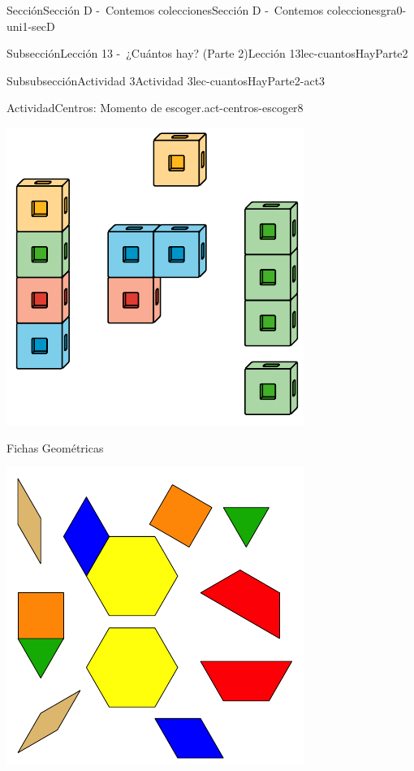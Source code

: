 \documentclass[twoside,10pt,]{article}
\begin{document}
\begin{sectionptx}{Sección}{Sección D -~Contemos colecciones}{}{Sección D -~Contemos colecciones}{}{}{gra0-uni1-secD}
\begin{subsectionptx}{Subsección}{Lección 13 -~¿Cuántos hay? (Parte 2)}{}{Lección 13}{}{}{lec-cuantosHayParte2}
\begin{subsubsectionptx}{Subsubsección}{Actividad 3}{}{Actividad 3}{}{}{lec-cuantosHayParte2-act3}
\begin{activity}{Actividad}{Centros: Momento de escoger.}{act-centros-escoger8}
\begin{sidebyside}{2}{0.025}{0.025}{0.05}
\begin{sbspanel}{0.45}
\includegraphics[width=\linewidth]{external/svg-source/tikz-file-128850.pdf}
\end{sbspanel}%
\begin{sbspanel}{0.45}%
Fichas Geométricas%
\par
\includegraphics[width=\linewidth]{external/svg-source/tikz-file-147344.pdf}

\end{sbspanel}
\end{sidebyside}
\end{activity}
\end{subsubsectionptx}
\end{subsectionptx}
\end{sectionptx}
\end{document}

